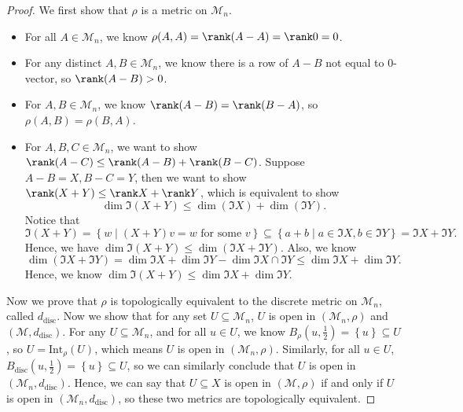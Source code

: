 \begin{proof}
  We first show that \(\rho \) is a metric on \(\mathcal{M} _n\). 
  \begin{itemize}
    \item For all \(A \in \mathcal{M} _n\), we know \(\rho (A, A) = \rank (A - A) = \rank 0 = 0\). 
    \item For any distinct \(A, B \in \mathcal{M} _n\), we know there is a row of \(A - B\) not equal to \(0\)-vector, so \(\rank (A - B) > 0\). 
    \item For \(A, B \in \mathcal{M} _n\), we know \(\rank (A - B) = \rank (B - A)\), so \(\rho (A, B) = \rho (B, A)\). 
    \item For \(A, B, C \in \mathcal{M} _n\), we want to show \(\rank (A - C) \le \rank (A - B) + \rank (B - C)\). Suppose \(A - B = X, B - C = Y\), then we want to show \(\rank (X + Y) \le \rank X + \rank Y\), which is equivalent to show 
    \[
      \dim \Im (X+Y) \le \dim (\Im X) + \dim (\Im Y).
    \] Notice that 
    \[
      \Im (X+Y) = \left\{ w \mid (X+Y)v = w \text{ for some } v \right\} \subseteq \left\{ a + b \mid a \in \Im X, b \in \Im Y \right\} = \Im X + \Im Y. 
    \]Hence, we have \(\dim \Im (X+Y) \le \dim (\Im X + \Im Y).\) Also, we know 
    \[
      \dim (\Im X + \Im Y) = \dim \Im X + \dim \Im Y - \dim \Im X \cap \Im Y \le \dim \Im X + \dim \Im Y.
    \] 
    Hence, we know \(\dim \Im (X + Y) \le \dim \Im X +\dim \Im Y\).  
  \end{itemize}  
  Now we prove that \(\rho \) is topologically equivalent to the discrete metric on \(\mathcal{M} _n\), called \(d_{\mathrm{disc}} \). Now we show that for any set \(U \subseteq \mathcal{M}_n\), \(U\) is open in \((\mathcal{M} _n, \rho )\) and \((\mathcal{M} , d_{\mathrm{disc} })\). For any \(U \subseteq \mathcal{M} _n\), and for all \(u \in U\), we know \(B_{\rho }\left( u, \frac{1}{2} \right)  = \left\{ u \right\} \subseteq U \), so \(U = \mathrm{Int}_{\rho }(U)  \), which means \(U\) is open in \((\mathcal{M}_n, \rho )\). Similarly, for all \(u \in U\), \(B_{\mathrm{disc}}\left( u, \frac{1}{2} \right) = \left\{ u \right\} \subseteq U  \), so we can similarly conclude that \(U\) is open in \((\mathcal{M} _n, d_{\mathrm{disc} })\). Hence, we can say that \(U \subseteq X\) is open in \((\mathcal{M} , \rho )\) if and only if \(U\) is open in \((\mathcal{M} _n, d_{\mathrm{disc} })\), so these two metrics are topologically equivalent.         
\end{proof}
